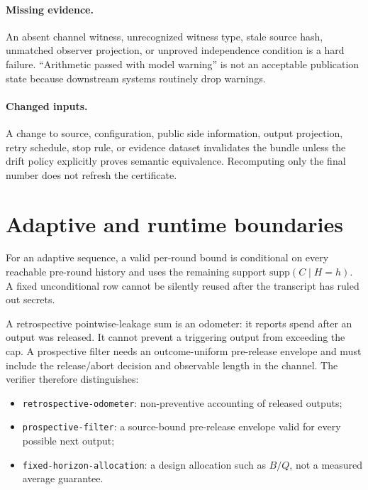 \documentclass[11pt]{article}
\newcommand{\supp}{\mathrm{supp}}
\begin{document}
\paragraph{Missing evidence.}
An absent channel witness, unrecognized witness type, stale source hash, unmatched observer projection, or unproved independence condition is a hard failure. ``Arithmetic passed with model warning'' is not an acceptable publication state because downstream systems routinely drop warnings.

\paragraph{Changed inputs.}
A change to source, configuration, public side information, output projection, retry schedule, stop rule, or evidence dataset invalidates the bundle unless the drift policy explicitly proves semantic equivalence. Recomputing only the final number does not refresh the certificate.

\section{Adaptive and runtime boundaries}\label{sec:adaptive}
For an adaptive sequence, a valid per-round bound is conditional on every reachable pre-round history and uses the remaining support \(\supp(C\mid H=h)\). A fixed unconditional row cannot be silently reused after the transcript has ruled out secrets.

A retrospective pointwise-leakage sum is an odometer: it reports spend after an output was released. It cannot prevent a triggering output from exceeding the cap. A prospective filter needs an outcome-uniform pre-release envelope and must include the release/abort decision and observable length in the channel. The verifier therefore distinguishes:
\begin{itemize}[leftmargin=*]
\item \texttt{retrospective-odometer}: non-preventive accounting of released outputs;
\item \texttt{prospective-filter}: a source-bound pre-release envelope valid for every possible next output;
\item \texttt{fixed-horizon-allocation}: a design allocation such as \(B/Q\), not a measured average guarantee.
\end{itemize}
\end{document}
